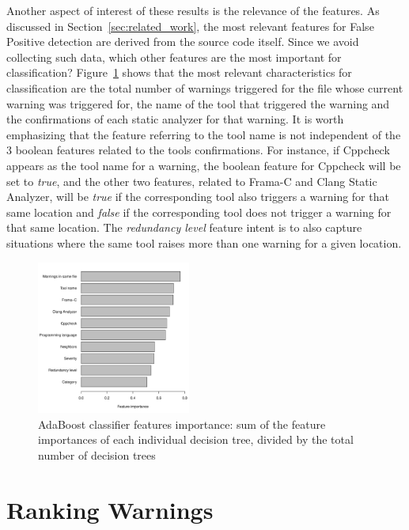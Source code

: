 Another aspect of interest of these results is the relevance of the features.
As discussed in Section~\ref{sec:related_work}, the most relevant features for
False Positive detection are derived from the source code itself. Since we
avoid collecting such data, which other features are the most important for
classification?  Figure~\ref{fig:feature_importance} shows that the most
relevant characteristics for classification are the total number of warnings
triggered for the file whose current warning was triggered for, the name of the
tool that triggered the warning and the confirmations of each static analyzer
for that warning. It is worth emphasizing that the feature referring to the
tool name is not independent of the 3 boolean features related to the tools
confirmations. For instance, if Cppcheck appears as the tool name for a warning,
the boolean feature for Cppcheck will be set to \emph{true}, and the other two
features, related to Frama-C and Clang Static Analyzer, will be \emph{true} if
the corresponding tool also triggers a warning for that same location and
\emph{false} if the corresponding tool does not trigger a warning for that same
location. The \emph{redundancy level} feature intent is to also capture
situations where the same tool raises more than one warning for a given
location.

\begin{figure}
\centering
\includegraphics[width=0.45\textwidth]{figures/importance.pdf}
  \caption{AdaBoost classifier features importance: sum of the feature importances of each individual decision tree, divided by the total number of decision trees}\label{fig:feature_importance}
\end{figure}

\section{Ranking Warnings}
\label{sec:results_ranking}

